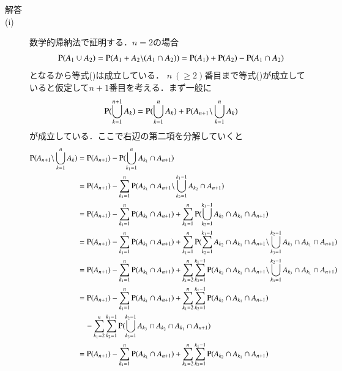 \begin{description}
	\begin{description}
		\item[解答]
		\item[\rm{(i)}] 数学的帰納法で証明する．$n=2$の場合
			\begin{align}
				\operatorname{P} (A_1 \cup A_2) = \operatorname{P} (A_1 + A_2 \backslash (A_1 \cap A_2))
				= \operatorname{P} (A_1) + \operatorname{P} (A_2) - \operatorname{P} (A_1 \cap A_2)
			\end{align}
			となるから等式()は成立している．
			$n\ (\geq 2)$番目まで等式()が成立していると仮定して$n+1$番目を考える．まず一般に
			\begin{align}
				\operatorname{P} (\bigcup_{k=1}^{n+1}A_k) = \operatorname{P} (\bigcup_{k=1}^{n}A_k) + \operatorname{P} (A_{n+1} \backslash \bigcup_{k=1}^{n}A_k)
			\end{align}
			が成立している．ここで右辺の第二項を分解していくと
			\begin{align}
				\prob{A_{n+1} \backslash \bigcup_{k=1}^{n}A_k} &= \prob{A_{n+1}} - \prob{\bigcup_{k_1=1}^{n}A_{k_1} \cap A_{n+1}} \\
				&= \prob{A_{n+1}} - \sum_{k_1=1}^{n} \prob{A_{k_1} \cap A_{n+1} \backslash \bigcup_{k_2=1}^{k_1 - 1}A_{k_2} \cap A_{n+1}} \\
				&= \prob{A_{n+1}} - \sum_{k_1=1}^{n} \prob{A_{k_1} \cap A_{n+1}} + \sum_{k_1=1}^{n} \prob{\bigcup_{k_2=1}^{k_1 - 1}A_{k_2} \cap A_{k_1} \cap A_{n+1}} \\
				&= \prob{A_{n+1}} - \sum_{k_1=1}^{n} \prob{A_{k_1} \cap A_{n+1}} + \sum_{k_1=1}^{n} \prob{\sum_{k_2=1}^{k_1 - 1} A_{k_2} \cap A_{k_1} \cap A_{n+1} \backslash \bigcup_{k_3=1}^{k_2 - 1} A_{k_3} \cap A_{k_1} \cap A_{n+1}} \\
				&= \prob{A_{n+1}} - \sum_{k_1=1}^{n} \prob{A_{k_1} \cap A_{n+1}} + \sum_{k_1=2}^{n} \sum_{k_2=1}^{k_1 - 1} \prob{A_{k_2} \cap A_{k_1} \cap A_{n+1} \backslash \bigcup_{k_3=1}^{k_2 - 1} A_{k_3} \cap A_{k_1} \cap A_{n+1}} \\
				&= \prob{A_{n+1}} - \sum_{k_1=1}^{n} \prob{A_{k_1} \cap A_{n+1}} + \sum_{k_1=2}^{n} \sum_{k_2=1}^{k_1 - 1} \prob{A_{k_2} \cap A_{k_1} \cap A_{n+1}} \\
					&\quad- \sum_{k_1=2}^{n} \sum_{k_2=1}^{k_1 - 1} \prob{\bigcup_{k_3=1}^{k_2 - 1} A_{k_3} \cap A_{k_2} \cap A_{k_1} \cap A_{n+1}} \\
				&= \prob{A_{n+1}} - \sum_{k_1=1}^{n} \prob{A_{k_1} \cap A_{n+1}} + \sum_{k_1=2}^{n} \sum_{k_2=1}^{k_1 - 1} \prob{A_{k_2} \cap A_{k_1} \cap A_{n+1}} \\

\end{align}
\end{description}
\end{description}
